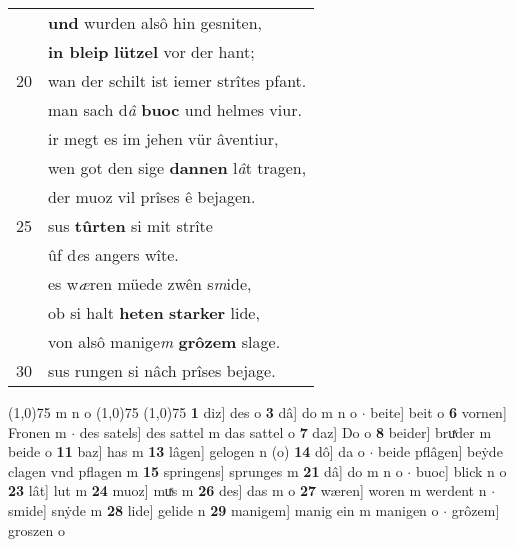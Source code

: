 \documentclass[8pt,a4paper,notitlepage]{article}
\begin{document}
\begin{table}[ht]
\begin{minipage}[t]{0.5\linewidth}
\begin{tabular}{rl}
 & \textbf{und} wurden alsô hin gesniten,\\ 
 & \textbf{in bleip} \textbf{lützel} vor der hant;\\ 
20 & wan der schilt ist iemer strîtes pfant.\\ 
 & man sach d\textit{â} \textbf{buoc} und helmes viur.\\ 
 & ir megt es im jehen vür âventiur,\\ 
 & wen got den sige \textbf{dannen} l\textit{â}t tragen,\\ 
 & der muoz vil prîses ê bejagen.\\ 
25 & sus \textbf{tûrten} si mit strîte\\ 
 & ûf d\textit{e}s angers wîte.\\ 
 & es w\textit{æ}ren müede zwên s\textit{m}ide,\\ 
 & ob si halt \textbf{heten} \textbf{starker} lide,\\ 
 & von alsô manige\textit{m} \textbf{grôzem} slage.\\ 
30 & sus rungen si nâch prîses bejage.\\ 
\end{tabular}
\scriptsize
\line(1,0){75} \newline
m n o \newline
\line(1,0){75} \newline
\newline
\line(1,0){75} \newline
\textbf{1} diz] des o \textbf{3} dâ] do m n o  $\cdot$ beite] beit o \textbf{6} vornen] Fronen m  $\cdot$ des satels] des sattel m das sattel o \textbf{7} daz] Do o \textbf{8} beider] bruͯder m beide o \textbf{11} baz] has m \textbf{13} lâgen] gelogen n (o) \textbf{14} dô] da o  $\cdot$ beide pflâgen] beẏde clagen vnd pflagen m \textbf{15} springens] sprunges m \textbf{21} dâ] do m n o  $\cdot$ buoc] blick n o \textbf{23} lât] lut m \textbf{24} muoz] muͯs m \textbf{26} des] das m o \textbf{27} wæren] woren m werdent n  $\cdot$ smide] snẏde m \textbf{28} lide] gelide n \textbf{29} manigem] manig ein m manigen o  $\cdot$ grôzem] groszen o \newline
\end{minipage}
\end{table}
\newpage
\end{document}

